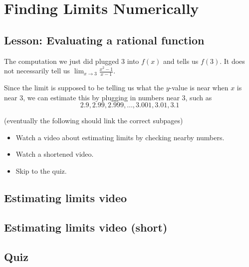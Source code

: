 \documentclass{ximera}
\begin{document}
\section{Finding Limits Numerically}
\subsection{Lesson: Evaluating a rational function}
\begin{center}
\end{center}

The computation we just did plugged 3 into $f(x)$ and tells us $f(3)$. It does not necessarily tell us $\lim_{x \to 3} \frac{x^2-1}{x-1}$.

Since the limit is supposed to be telling us what the $y$-value is near when $x$ is near $3$, we can estimate this by plugging in numbers near $3$, such as
\[
    2.9, 2.99, 2.999, \ldots, 3.001, 3.01, 3.1
\]

(eventually the following should link the correct subpages)
\begin{itemize}
    \item {} Watch a video about estimating limits by checking nearby numbers.
    \item {} Watch a shortened video.
    \item {} Skip to the quiz.
\end{itemize}


\subsection{Estimating limits video}
\begin{center}
\end{center}

\subsection{Estimating limits video (short)}

\begin{center}
\end{center}

\subsection{Quiz}
\end{document}
